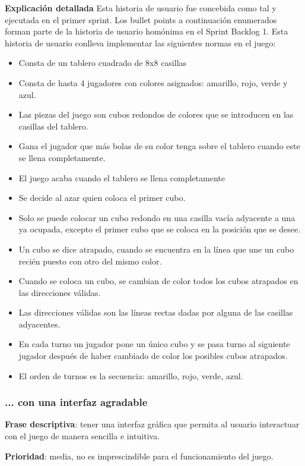 \documentclass[../../FINAL/Scrum/SCRUM.tex]{subfiles}
\begin{document}
\textbf{Explicación detallada}
Esta historia de usuario fue concebida como tal y ejecutada en el primer sprint. Los  bullet points a continuación enumerados forman parte de la historia de usuario homónima en el Sprint Backlog 1.
Esta historia de usuario conlleva implementar las siguientes normas en el juego:
\begin{itemize}
\item Consta de un tablero cuadrado de 8x8 casillas
\item Consta de hasta 4 jugadores con colores asignados: amarillo, rojo, verde y azul.
\item Las piezas del juego son cubos redondos de colores que se introducen en las casillas del tablero.
\item Gana el jugador que más bolas de su color tenga sobre el tablero cuando este se llena completamente.
\item El juego acaba cuando el tablero se llena completamente
\item Se decide al azar quien coloca el primer cubo.
\item Solo se puede colocar un cubo redondo en una casilla vacía adyacente a una ya ocupada, excepto el primer cubo que se coloca en la posición que se desee.
\item Un cubo se dice atrapado, cuando se encuentra en la línea que une un cubo recién puesto con otro del mismo color.
\item Cuando se coloca un cubo, se cambian de color todos los cubos atrapados en las direcciones válidas.
\item Las direcciones válidas son las líneas rectas dadas por alguna de las casillas adyacentes.
\item En cada turno un jugador pone un único cubo y se pasa turno al siguiente jugador después de haber cambiado de color los posibles cubos atrapados.
\item El orden de turnos es la secuencia: amarillo, rojo, verde, azul.\end{itemize}

\subsubsection{... con una interfaz agradable}
\textbf{Frase descriptiva}: tener una interfaz gráfica que permita al usuario interactuar con el juego de manera sencilla e intuitiva.

\textbf{Prioridad}: media, no es imprescindible para el funcionamiento del juego.
\end{document}
